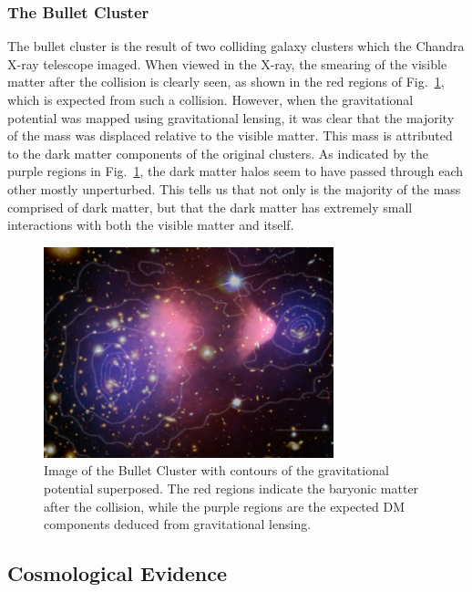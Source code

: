 \subsubsection*{The Bullet Cluster}

The bullet cluster is the result of two colliding galaxy clusters which the Chandra X-ray telescope imaged. When viewed in the X-ray, the smearing of the visible matter after the collision is clearly seen, as shown in the red regions of Fig.~\ref{fig:bullet_cluster}, which is expected from such a collision. However, when the gravitational potential was mapped using gravitational lensing, it was clear that the majority of the mass was displaced relative to the visible matter. This mass is attributed to the dark matter components of the original clusters. As indicated by the purple regions in Fig.~\ref{fig:bullet_cluster}, the dark matter halos seem to have passed through each other mostly unperturbed. This tells us that not only is the majority of the mass comprised of dark matter, but that the dark matter has extremely small interactions with both the visible matter and itself. 

\begin{figure}[t!]
    \centering
    \includegraphics[width = 0.75\textwidth]{bullet_cluster}
    \caption{Image of the Bullet Cluster with contours of the gravitational potential superposed. The red regions indicate the baryonic matter after the collision, while the purple regions are the expected DM components deduced from gravitational lensing. }
    \label{fig:bullet_cluster}
\end{figure}

\subsection{Cosmological Evidence}

